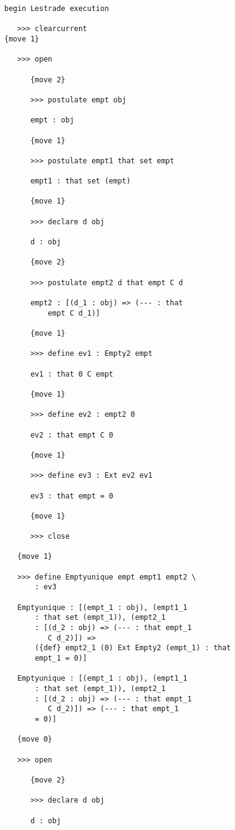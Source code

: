 \documentclass[12pt]{article}
\begin{document}
\begin{enumerate}
\begin{verbatim}
begin Lestrade execution

   >>> clearcurrent
{move 1}

   >>> open

      {move 2}

      >>> postulate empt obj

      empt : obj

      {move 1}

      >>> postulate empt1 that set empt

      empt1 : that set (empt)

      {move 1}

      >>> declare d obj

      d : obj

      {move 2}

      >>> postulate empt2 d that empt C d

      empt2 : [(d_1 : obj) => (--- : that 
          empt C d_1)]

      {move 1}

      >>> define ev1 : Empty2 empt

      ev1 : that 0 C empt

      {move 1}

      >>> define ev2 : empt2 0

      ev2 : that empt C 0

      {move 1}

      >>> define ev3 : Ext ev2 ev1

      ev3 : that empt = 0

      {move 1}

      >>> close

   {move 1}

   >>> define Emptyunique empt empt1 empt2 \
       : ev3

   Emptyunique : [(empt_1 : obj), (empt1_1 
       : that set (empt_1)), (empt2_1 
       : [(d_2 : obj) => (--- : that empt_1 
          C d_2)]) => 
       ({def} empt2_1 (0) Ext Empty2 (empt_1) : that 
       empt_1 = 0)]

   Emptyunique : [(empt_1 : obj), (empt1_1 
       : that set (empt_1)), (empt2_1 
       : [(d_2 : obj) => (--- : that empt_1 
          C d_2)]) => (--- : that empt_1 
       = 0)]

   {move 0}

   >>> open

      {move 2}

      >>> declare d obj

      d : obj


\end{verbatim}
\end{enumerate}
\end{document}
